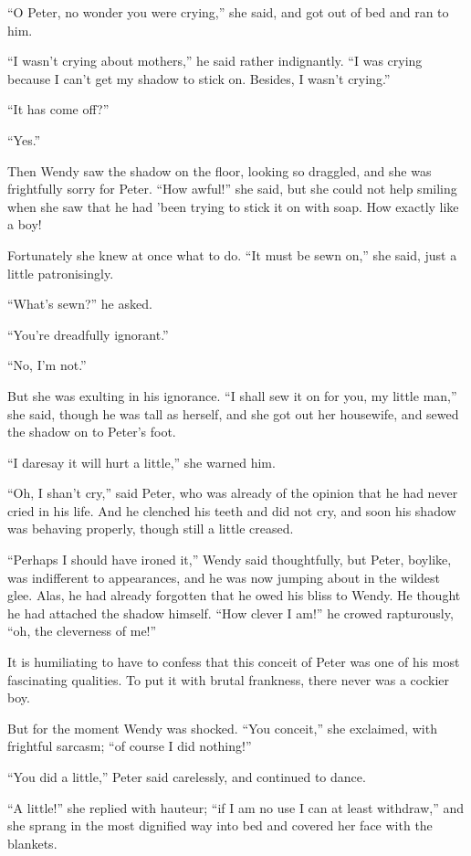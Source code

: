 ``O Peter, no wonder you were crying,'' she said, and got out of bed and ran to
him.

``I wasn't crying about mothers,'' he said rather indignantly. ``I was crying
because I can't get my shadow to stick on. Besides, I wasn't crying.''

``It has come off?''

``Yes.''

Then Wendy saw the shadow on the floor, looking so draggled, and she was
frightfully sorry for Peter. ``How awful!'' she said, but she could not help
smiling when she saw that he had 'been trying to stick it on with soap. How
exactly like a boy!

Fortunately she knew at once what to do. ``It must be sewn on,'' she said, just
a little patronisingly.

``What's sewn?'' he asked.

``You're dreadfully ignorant.''

``No, I'm not.''

But she was exulting in his ignorance. ``I shall sew it on for you, my little
man,'' she said, though he was tall as herself, and she got out her housewife,
and sewed the shadow on to Peter's foot.

``I daresay it will hurt a little,'' she warned him.

``Oh, I shan't cry,'' said Peter, who was already of the opinion that he had
never cried in his life. And he clenched his teeth and did not cry, and soon his
shadow was behaving properly, though still a little creased.

``Perhaps I should have ironed it,'' Wendy said thoughtfully, but Peter,
boylike, was indifferent to appearances, and he was now jumping about in the
wildest glee. Alas, he had already forgotten that he owed his bliss to Wendy. He
thought he had attached the shadow himself. ``How clever I am!'' he crowed
rapturously, ``oh, the cleverness of me!''

It is humiliating to have to confess that this conceit of Peter was one of his
most fascinating qualities. To put it with brutal frankness, there never was a
cockier boy.

But for the moment Wendy was shocked. ``You conceit,'' she exclaimed, with
frightful sarcasm; ``of course I did nothing!''

``You did a little,'' Peter said carelessly, and continued to dance.

``A little!'' she replied with hauteur; ``if I am no use I can at least
withdraw,'' and she sprang in the most dignified way into bed and covered her
face with the blankets.

